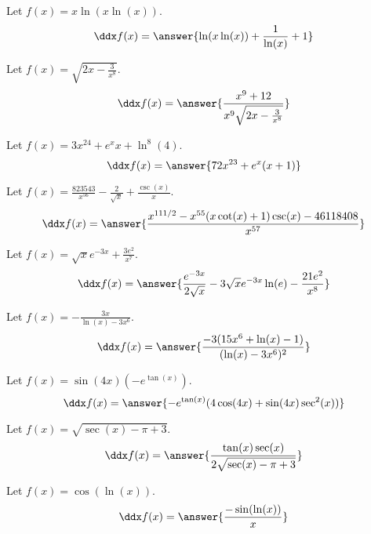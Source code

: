 \documentclass{ximera}
\begin{document}
\begin{shuffle}

\begin{exercise}
Let $f(x)=x \ln (x \ln (x))$.
\[
\ddx f(x) = \answer{\ln (x \ln (x))+\frac{1}{\ln (x)}+1}
\]
\end{exercise}

\begin{exercise}
Let $f(x)=\sqrt{2 x-\frac{3}{x^8}}$.
\[
\ddx f(x) = \answer{\frac{x^9+12}{x^9 \sqrt{2 x-\frac{3}{x^8}}}}
\]
\end{exercise}

\begin{exercise}
Let $f(x)=3 x^{24}+e^x x+\ln ^8(4)$.
\[
\ddx f(x) = \answer{72 x^{23}+e^x (x+1)}
\]
\end{exercise}

\begin{exercise}
Let $f(x)=\frac{823543}{x^{56}}-\frac{2}{\sqrt{x}}+\frac{\csc (x)}{x}$.
\[
\ddx f(x) = \answer{\frac{x^{111/2}-x^{55} (x \cot (x)+1) \csc (x)-46118408}{x^{57}}}
\]
\end{exercise}

\begin{exercise}
Let $f(x)=\sqrt{x} e^{-3 x}+\frac{3 e^2}{x^7}$.
\[
\ddx f(x) = \answer{\frac{e^{-3 x}}{2 \sqrt{x}}-3 \sqrt{x} e^{-3 x} \ln (e)-\frac{21 e^2}{x^8}}
\]
\end{exercise}

\begin{exercise}
Let $f(x)=-\frac{3 x}{\ln (x)-3 x^6}$.
\[
\ddx f(x) = \answer{\frac{-3 (15 x^6+\ln (x)-1)}{(\ln (x)-3 x^6)^2}}
\]
\end{exercise}

\begin{exercise}
Let $f(x)=\sin (4 x) (-e^{\tan (x)})$.
\[
\ddx f(x) = \answer{-e^{\tan (x)} (4 \cos (4 x)+\sin (4 x) \sec ^2(x))}
\]
\end{exercise}

\begin{exercise}
Let $f(x)=\sqrt{\sec (x)-\pi +3}$.
\[
\ddx f(x) = \answer{\frac{\tan (x) \sec (x)}{2 \sqrt{\sec (x)-\pi +3}}}
\]
\end{exercise}

\begin{exercise}
Let $f(x)=\cos (\ln (x))$.
\[
\ddx f(x) = \answer{\frac{-\sin (\ln (x))}{x}}
\]
\end{exercise}


\end{shuffle}
\end{document}
